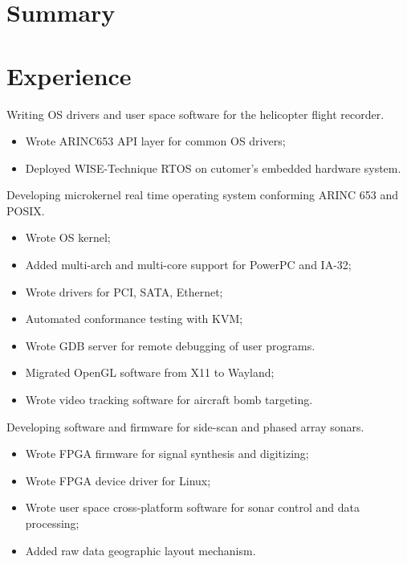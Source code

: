 \documentclass[11pt, a4paper]{moderncv}
\begin{document}
\makecvtitle



\section{Summary}





\section{Experience}

	{Writing OS drivers and user space software for the helicopter flight recorder.
	\begin{itemize}
	\item Wrote ARINC653 API layer for common OS drivers;
	\item Deployed WISE-Technique RTOS on cutomer's embedded hardware system.
	\end{itemize}}

	{Developing microkernel real time operating system conforming ARINC 653 and POSIX.
	\begin{itemize}
	\item Wrote OS kernel;
	\item Added multi-arch and multi-core support for PowerPC and IA-32;
	\item Wrote drivers for PCI, SATA, Ethernet;
	\item Automated conformance testing with KVM;
	\item Wrote GDB server for remote debugging of user programs.
	\end{itemize}}

	{
	\begin{itemize}
	\item Migrated OpenGL software from X11 to Wayland;
	\item Wrote video tracking software for aircraft bomb targeting.
	\end{itemize}}

   {Developing software and firmware for side-scan and phased array sonars.
   \begin{itemize}
	\item Wrote FPGA firmware for signal synthesis and digitizing;
	\item Wrote FPGA device driver for Linux;
	\item Wrote user space cross-platform software for sonar control and data processing;
	\item Added raw data geographic layout mechanism.
	\end{itemize}}
\end{document}
